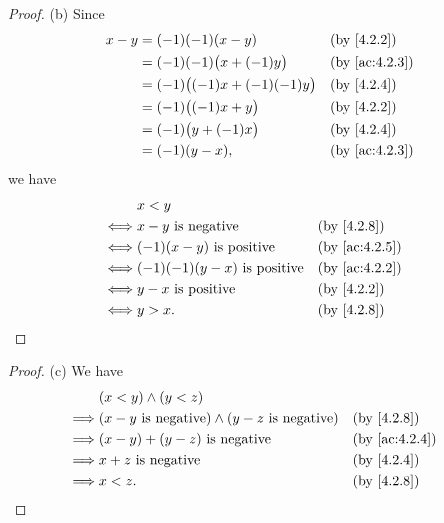 \begin{proof}{(b)}
  Since
  \begin{align*}
    x - y & = (-1)(-1)(x - y)                 &  & \by{4.2.2}    \\
          & = (-1)(-1)\big(x + (-1)y\big)     &  & \by{ac:4.2.3} \\
          & = (-1)\big((-1)x + (-1)(-1)y\big) &  & \by{4.2.4}    \\
          & = (-1)\big((-1)x + y\big)         &  & \by{4.2.2}    \\
          & = (-1)\big(y + (-1)x\big)         &  & \by{4.2.4}    \\
          & = (-1)(y - x),                    &  & \by{ac:4.2.3}
  \end{align*}
  we have
  \begin{align*}
         & x < y                                                  \\
    \iff & x - y \text{ is negative}           &  & \by{4.2.8}    \\
    \iff & (-1)(x - y) \text{ is positive}     &  & \by{ac:4.2.5} \\
    \iff & (-1)(-1)(y - x) \text{ is positive} &  & \by{ac:4.2.2} \\
    \iff & y - x \text{ is positive}           &  & \by{4.2.2}    \\
    \iff & y > x.                              &  & \by{4.2.8}
  \end{align*}
\end{proof}

\begin{proof}{(c)}
  We have
  \begin{align*}
             & (x < y) \land (y < z)                                                            \\
    \implies & (x - y \text{ is negative}) \land (y - z \text{ is negative}) &  & \by{4.2.8}    \\
    \implies & (x - y) + (y - z) \text{ is negative}                         &  & \by{ac:4.2.4} \\
    \implies & x + z \text{ is negative}                                     &  & \by{4.2.4}    \\
    \implies & x < z.                                                        &  & \by{4.2.8}
  \end{align*}
\end{proof}

